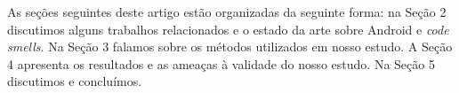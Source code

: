 
As se\c{c}\~oes seguintes deste artigo estão organizadas da seguinte forma: na Se\c{c}\~ao 2 discutimos alguns trabalhos relacionados e o estado da arte sobre Android e \textit{code smells}. Na Se\c{c}\~ao 3 falamos sobre os m\'etodos utilizados em nosso estudo. A Se\c{c}\~ao 4 apresenta os resultados e as amea\c{c}as \`a validade do nosso estudo. Na Se\c{c}\~ao 5 discutimos e conclu\'imos.\\ 
